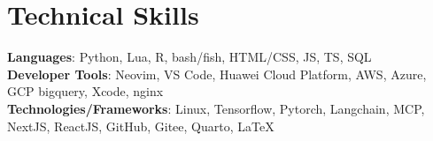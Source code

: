 \documentclass[letterpaper,11pt]{article}
\makeatletter
\newcommand{\resumeItem}[1]{
  \item\small{
    {#1 \vspace{-2pt}}
  }
}
\newcommand{\resumeSubheading}[4]{
  \vspace{-2pt}\item
    \begin{tabular*}{1.0\textwidth}[t]{l@{\extracolsep{\fill}}r}
      \textbf{#1} & \textbf{\small #2} \\
      \textit{\small#3} & \textit{\small #4} \\
    \end{tabular*}\vspace{-7pt}
}
\newcommand{\resumeSubHeadingListStart}{\begin{itemize}[leftmargin=0.0in, label={}]}
\newcommand{\resumeSubHeadingListEnd}{\end{itemize}}
\newcommand{\resumeItemListStart}{\begin{itemize}}
\newcommand{\resumeItemListEnd}{\end{itemize}\vspace{-5pt}}
\makeatother
\begin{document}
\section{Technical Skills}
 \begin{itemize}[leftmargin=0.15in, label={}]
    \small{\item{
     \textbf{Languages}{: Python, Lua, R, bash/fish, HTML/CSS, JS, TS, SQL} \\
     \textbf{Developer Tools}{: Neovim, VS Code, Huawei Cloud Platform, AWS, Azure, GCP bigquery, Xcode, nginx} \\
     \textbf{Technologies/Frameworks}{: Linux, Tensorflow, Pytorch, Langchain, MCP, NextJS, ReactJS, GitHub, Gitee, Quarto, \LaTeX} \\
    }}
 \end{itemize}
 \vspace{-16pt}



\end{document}
